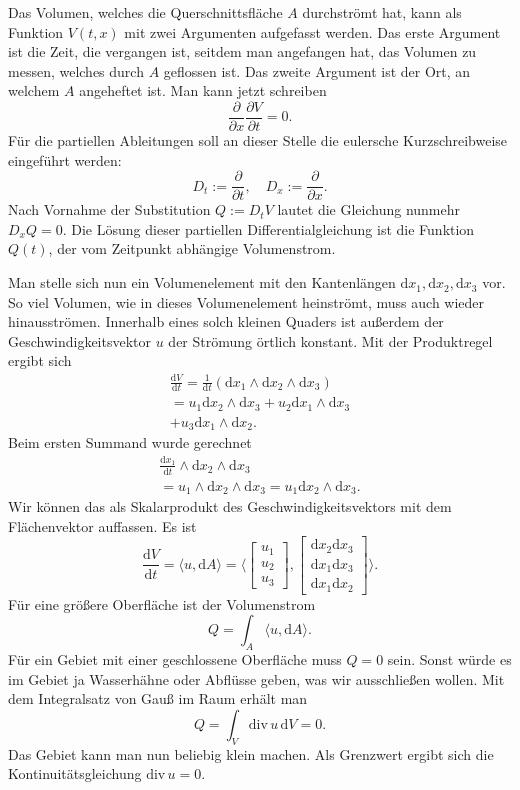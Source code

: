 \documentclass[a4paper,10pt,fleqn,twocolumn,twoside]{scrartcl}
\begin{document}
Das Volumen, welches die Querschnittsfläche \(A\) durchströmt hat,
kann als Funktion \(V(t,x)\) mit zwei Argumenten aufgefasst werden.
Das erste Argument ist die Zeit, die vergangen ist,
seitdem man angefangen hat, das Volumen zu messen, welches durch
\(A\) geflossen ist. Das zweite Argument ist der Ort, an welchem
\(A\) angeheftet ist. Man kann jetzt schreiben
\[\frac{\partial}{\partial x}\frac{\partial V}{\partial t}=0.\]
Für die partiellen Ableitungen soll an dieser Stelle die eulersche
Kurzschreibweise eingeführt werden:
\[D_t := \frac{\partial}{\partial t},\quad
D_x := \frac{\partial}{\partial x}.\]
Nach Vornahme der Substitution \(Q:=D_tV\) lautet die
Gleichung nunmehr \(D_x Q=0\). Die Lösung dieser partiellen
Differentialgleichung ist die Funktion \(Q(t)\), der vom
Zeitpunkt abhängige Volumenstrom.

Man stelle sich nun ein Volumenelement mit den Kantenlängen
\(\mathrm dx_1,\mathrm dx_2,\mathrm dx_3\) vor. So viel Volumen, wie
in dieses Volumenelement heinströmt, muss auch wieder hinausströmen.
Innerhalb eines solch kleinen Quaders ist außerdem der
Geschwindigkeitsvektor \(u\) der Strömung örtlich konstant.
Mit der Produktregel ergibt sich
\begin{gather*}\frac{\mathrm dV}{\mathrm dt}
= \frac{1}{\mathrm dt}
(\mathrm dx_1\wedge\mathrm dx_2\wedge\mathrm dx_3)\\
= u_1 \mathrm dx_2\wedge\mathrm dx_3 +
u_2\mathrm dx_1\wedge\mathrm dx_3\\
+ u_3\mathrm dx_1\wedge\mathrm dx_2.
\end{gather*}
Beim ersten Summand wurde gerechnet
\begin{gather*}
\frac{\mathrm dx_1}{\mathrm dt}\wedge
\mathrm dx_2\wedge\mathrm dx_3\\
= u_1\wedge\mathrm dx_2\wedge\mathrm dx_3
= u_1\mathrm dx_2\wedge\mathrm dx_3.
\end{gather*}
Wir können das als Skalarprodukt des Geschwindigkeitsvektors mit dem
Flächenvektor auffassen. Es ist
\[\frac{\mathrm dV}{\mathrm dt} = \langle u,\mathrm dA\rangle
= \langle\begin{bmatrix} u_1\\u_2\\ u_3\end{bmatrix},
\begin{bmatrix}\mathrm dx_2\mathrm dx_3\\
\mathrm dx_1\mathrm dx_3\\
\mathrm dx_1\mathrm dx_2
\end{bmatrix}\rangle.\]
Für eine größere Oberfläche ist der Volumenstrom
\[Q=\int_A \langle u,\mathrm dA\rangle.\]
Für ein Gebiet mit einer geschlossene Oberfläche muss \(Q=0\) sein.
Sonst würde es im Gebiet ja Wasserhähne oder Abflüsse geben, was wir
ausschließen wollen. Mit dem Integralsatz von Gauß im Raum erhält man
\[Q=\int_V \mathrm{div}\,u\,\mathrm dV=0.\]
Das Gebiet kann man nun beliebig klein machen. Als Grenzwert ergibt
sich die Kontinuitätsgleichung \(\mathrm{div}\,u=0\).
\end{document}
